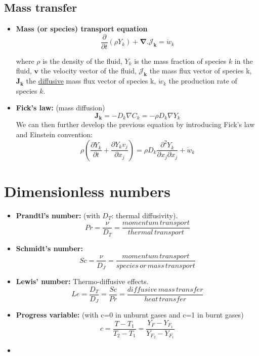 \documentclass[a4paper,11pt]{article}
\begin{document}
\subsection{Mass transfer}
\begin{itemize}
	\item \textbf{Mass (or species) transport equation}
		\[
	\frac{\partial}{\partial t}(\rho Y_k)+\mathbf{\nabla} . \mathbf{\mathcal{J}_k} = \dot{w}_k
	\]
	\begin{center}
	\end{center}

where $\rho$ is the density of the fluid, $Y_k$ is the mass fraction of species $k$ in the fluid, $\mathbf{v}$ the velocity vector of the fluid, $\mathbf{\mathcal{J}_k}$ the mass flux vector of species k,  $\mathbf{J_k}$ the \underline{diffusive} mass flux vector of species k, $\dot{w}_k$ the production rate of species $k$.
\item \textbf{Fick's law:} (mass diffusion)
\[
\mathbf{J_k} = -D_k \nabla C_k = - \rho D_k \nabla Y_k
\]
We can then further develop the previous equation by introducing Fick's law and Einstein convention:
\[
\rho(\frac{\partial Y_k}{\partial t}+\frac{\partial Y_k v_j}{\partial x_j}) = \rho D_k \frac{\partial^2 Y_k}{\partial x_j \partial x_j} + \dot{w}_k
\]
\end{itemize}
\section{Dimensionless numbers}
\begin{itemize}
\item \textbf{Prandtl's number:} (with $D_T$: thermal diffusivity).
\[Pr = \frac{\nu}{D_T}=\frac{momentum \, transport}{thermal \, transport}\]
\item \textbf{Schmidt's number:} 
\[Sc=\frac{\nu}{D_J}=\frac{momentum \, transport}{species \, or \, mass \, transport}\]
\item \textbf{Lewis' number:} Thermo-diffusive effects.
\[Le=\frac{D_T}{D_J} = \frac{Sc}{Pr} = \frac{diffusive \, mass \, transfer}{heat \, transfer}\]
\item \textbf{Progress variable:} (with c=0 in unburnt gases and c=1 in burnt gases)
\[c = \frac{T-T_1}{T_2 - T_1} = \frac{Y_F - Y_{F_1}}{Y_{F_2}-Y_{F_1}}\]
	\item 
\end{itemize}
\end{document}
